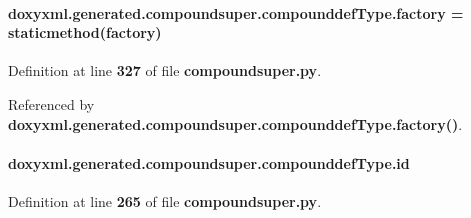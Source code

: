 \paragraph[{factory}]{\setlength{\rightskip}{0pt plus 5cm}doxyxml.\+generated.\+compoundsuper.\+compounddef\+Type.\+factory = staticmethod(factory)\hspace{0.3cm}{\ttfamily [static]}}\label{classdoxyxml_1_1generated_1_1compoundsuper_1_1compounddefType_a79d5d1cef42f339dcb2fc746c303b26f}


Definition at line {\bf 327} of file {\bf compoundsuper.\+py}.



Referenced by {\bf doxyxml.\+generated.\+compoundsuper.\+compounddef\+Type.\+factory()}.

\paragraph[{id}]{\setlength{\rightskip}{0pt plus 5cm}doxyxml.\+generated.\+compoundsuper.\+compounddef\+Type.\+id}\label{classdoxyxml_1_1generated_1_1compoundsuper_1_1compounddefType_abc0551174b697fd1f9c56dfbfa268eab}


Definition at line {\bf 265} of file {\bf compoundsuper.\+py}.




